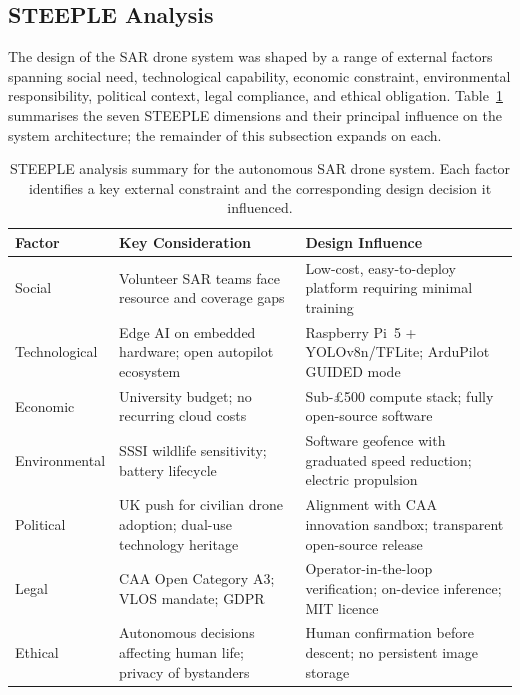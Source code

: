 \subsection{STEEPLE Analysis}\label{sec:steeple}

The design of the SAR drone system was shaped by a range of external factors spanning social need, technological capability, economic constraint, environmental responsibility, political context, legal compliance, and ethical obligation. Table~\ref{tab:steeple} summarises the seven STEEPLE dimensions and their principal influence on the system architecture; the remainder of this subsection expands on each.

\begin{table}[htbp]
\centering
\caption{STEEPLE analysis summary for the autonomous SAR drone system.  Each factor identifies a key external constraint and the corresponding design decision it influenced.}
\label{tab:steeple}
\small
\begin{tabular}{p{2.2cm}p{5.0cm}p{5.3cm}}
\toprule
\textbf{Factor} & \textbf{Key Consideration} & \textbf{Design Influence} \\
\midrule
Social & Volunteer SAR teams face resource and coverage gaps & Low-cost, easy-to-deploy platform requiring minimal training \\
Technological & Edge AI on embedded hardware; open autopilot ecosystem & Raspberry Pi~5 + YOLOv8n/TFLite; ArduPilot GUIDED mode \\
Economic & University budget; no recurring cloud costs & Sub-\pounds500 compute stack; fully open-source software \\
Environmental & SSSI wildlife sensitivity; battery lifecycle & Software geofence with graduated speed reduction; electric propulsion \\
Political & UK push for civilian drone adoption; dual-use technology heritage & Alignment with CAA innovation sandbox; transparent open-source release \\
Legal & CAA Open Category A3; VLOS mandate; GDPR & Operator-in-the-loop verification; on-device inference; MIT licence \\
Ethical & Autonomous decisions affecting human life; privacy of bystanders & Human confirmation before descent; no persistent image storage \\
\bottomrule
\end{tabular}
\end{table}

